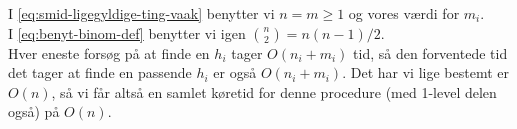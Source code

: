 I \cref{eq:smid-ligegyldige-ting-vaak} benytter vi $n = m \geq 1$ og vores værdi for $m_i$.\\
I \cref{eq:benyt-binom-def} benytter vi igen $\binom{n}{2} = n(n-1)/2$.\\



Hver eneste forsøg på at finde en $h_i$ tager $O(n_i + m_i)$ tid, så den forventede tid det tager at finde en passende $h_i$ er også $O(n_i + m_i)$. Det har vi lige bestemt er $O(n)$, så vi får altså en samlet køretid for denne procedure (med 1-level delen også) på $O(n)$.


